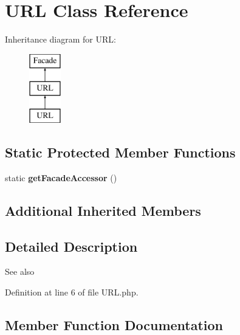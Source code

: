 \section{U\+R\+L Class Reference}
\label{class_illuminate_1_1_support_1_1_facades_1_1_u_r_l}
Inheritance diagram for U\+R\+L\+:\begin{figure}[H]
\begin{center}
\leavevmode
\includegraphics[height=3.000000cm]{class_illuminate_1_1_support_1_1_facades_1_1_u_r_l}
\end{center}
\end{figure}
\subsection*{Static Protected Member Functions}
\begin{DoxyCompactItemize}
\item 
static {\bf get\+Facade\+Accessor} ()
\end{DoxyCompactItemize}
\subsection*{Additional Inherited Members}


\subsection{Detailed Description}
\begin{DoxySeeAlso}{See also}

\end{DoxySeeAlso}


Definition at line 6 of file U\+R\+L.\+php.



\subsection{Member Function Documentation}
